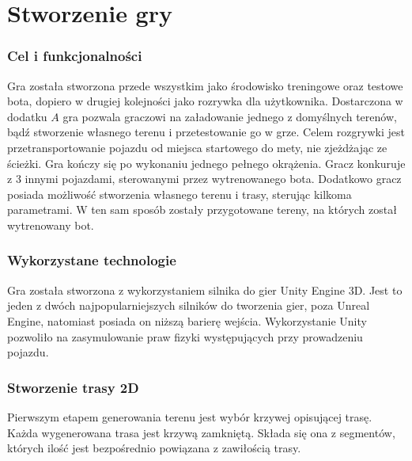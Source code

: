 \chapter{Stworzenie gry}
\thispagestyle{chapterBeginStyle}
\label{rozdzial1}


\subsection{Cel i funkcjonalności}
Gra została stworzona przede wszystkim jako środowisko treningowe oraz testowe bota, dopiero w drugiej kolejności jako rozrywka dla użytkownika. Dostarczona w dodatku $A$ gra pozwala graczowi na załadowanie jednego z domyślnych terenów, bądź stworzenie własnego terenu i przetestowanie go w grze. Celem rozgrywki jest przetransportowanie pojazdu od miejsca startowego do mety, nie zjeżdżając ze ścieżki. Gra kończy się po wykonaniu jednego pełnego okrążenia. Gracz konkuruje z 3 innymi pojazdami, sterowanymi przez wytrenowanego bota. Dodatkowo gracz posiada możliwość stworzenia własnego terenu i trasy, sterując kilkoma parametrami. W ten sam sposób zostały przygotowane tereny, na których został wytrenowany bot.

\subsection{Wykorzystane technologie}
Gra została stworzona z wykorzystaniem silnika do gier Unity Engine 3D. Jest to jeden z dwóch najpopularniejszych silników do tworzenia gier, poza Unreal Engine, natomiast posiada on niższą barierę wejścia. Wykorzystanie Unity pozwoliło na zasymulowanie praw fizyki występujących przy prowadzeniu pojazdu.

\subsection{Stworzenie trasy 2D}
Pierwszym etapem generowania terenu jest wybór krzywej opisującej trasę. Każda wygenerowana trasa jest krzywą zamkniętą. Składa się ona z segmentów, których ilość jest bezpośrednio powiązana z zawiłością trasy. 

